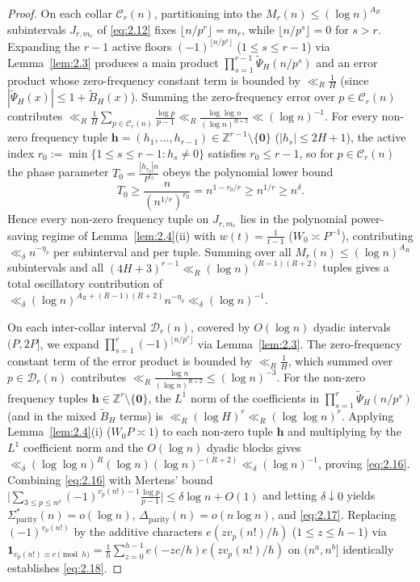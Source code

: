 \documentclass[11pt,reqno]{amsart}
\theoremstyle{remark}
\numberwithin{equation}{section}
\newcommand{\Z}{\mathbb{Z}}
\newcommand{\Dparity}{\Delta_{\mathrm{parity}}}
\newcommand{\Sparitys}{\Sigma_{\mathrm{parity}}^*}
\begin{document}
\begin{proof}
On each collar $\mathcal{C}_r(n)$, partitioning into the $M_r(n) \le (\log n)^{A_R}$ subintervals $J_{r,m_r}$ of \eqref{eq:2.12} fixes $\lfloor n/p^r \rfloor = m_r$, while $\lfloor n/p^s \rfloor = 0$ for $s > r$. Expanding the $r - 1$ active floors $(-1)^{\lfloor n/p^s \rfloor}$ ($1 \le s \le r - 1$) via Lemma~\ref{lem:2.3} produces a main product $\prod_{s=1}^{r-1} \widetilde{\Psi}_H(n/p^s)$ and an error product whose zero-frequency constant term is bounded by $\ll_R \frac{1}{H}$ (since $|\widetilde{\Psi}_H(x)| \le 1 + \widetilde{B}_H(x)$). Summing the zero-frequency error over $p \in \mathcal{C}_r(n)$ contributes $\ll_R \frac{1}{H} \sum_{p \in \mathcal{C}_r(n)} \frac{\log p}{p-1} \ll_R \frac{\log\log n}{(\log n)^{R+2}} \ll (\log n)^{-1}$. For every non-zero frequency tuple $\mathbf{h} = (h_1, \dots, h_{r-1}) \in \Z^{r-1} \setminus \{\mathbf{0}\}$ ($|h_s| \le 2H + 1$), the active index $r_0 := \min\{1 \le s \le r - 1 : h_s \ne 0\}$ satisfies $r_0 \le r - 1$, so for $p \in \mathcal{C}_r(n)$ the phase parameter $T_0 = \frac{|h_{r_0}|n}{P^{r_0}}$ obeys the polynomial lower bound
\[
T_0 \ge \frac{n}{(n^{1/r})^{r_0}} = n^{1 - r_0/r} \ge n^{1/r} \ge n^\delta.
\]
Hence every non-zero frequency tuple on $J_{r,m_r}$ lies in the polynomial power-saving regime of Lemma~\ref{lem:2.4}(ii) with $w(t) = \frac{1}{t-1}$ ($W_0 \asymp P^{-1}$), contributing $\ll_\delta n^{-\eta_\delta}$ per subinterval and per tuple. Summing over all $M_r(n) \le (\log n)^{A_R}$ subintervals and all $(4H + 3)^{r-1} \ll_R (\log n)^{(R-1)(R+2)}$ tuples gives a total oscillatory contribution of $\ll_\delta (\log n)^{A_R + (R-1)(R+2)} n^{-\eta_\delta} \ll_\delta (\log n)^{-1}$.

On each inter-collar interval $\mathcal{D}_r(n)$, covered by $O(\log n)$ dyadic intervals $(P, 2P]$, we expand $\prod_{s=1}^r (-1)^{\lfloor n/p^s \rfloor}$ via Lemma~\ref{lem:2.3}. The zero-frequency constant term of the error product is bounded by $\ll_R \frac{1}{H}$, which summed over $p \in \mathcal{D}_r(n)$ contributes $\ll_R \frac{\log n}{(\log n)^{R+2}} \le (\log n)^{-3}$. For the non-zero frequency tuples $\mathbf{h} \in \Z^r \setminus \{\mathbf{0}\}$, the $L^1$ norm of the coefficients in $\prod_{s=1}^r \widetilde{\Psi}_H(n/p^s)$ (and in the mixed $\widetilde{B}_H$ terms) is $\ll_R (\log H)^r \ll_R (\log\log n)^r$. Applying Lemma~\ref{lem:2.4}(i) ($W_0 P \asymp 1$) to each non-zero tuple $\mathbf{h}$ and multiplying by the $L^1$ coefficient norm and the $O(\log n)$ dyadic blocks gives $\ll_\delta (\log\log n)^R (\log n)(\log n)^{-(R+2)} \ll_\delta (\log n)^{-1}$, proving \eqref{eq:2.16}. Combining \eqref{eq:2.16} with Mertens' bound $\bigl|\sum_{3 \le p \le n^\delta} (-1)^{v_p(n!)-1} \frac{\log p}{p-1}\bigr| \le \delta\log n + O(1)$ and letting $\delta \downarrow 0$ yields $\Sparitys(n) = o(\log n)$, $\Dparity(n) = o(n\log n)$, and \eqref{eq:2.17}. Replacing $(-1)^{v_p(n!)}$ by the additive characters $e(z v_p(n!)/h)$ ($1 \le z \le h - 1$) via $\mathbf{1}_{v_p(n!) \equiv c \pmod h} = \frac{1}{h} \sum_{z=0}^{h-1} e(-zc/h)e(zv_p(n!)/h)$ on $(n^a, n^b]$ identically establishes \eqref{eq:2.18}.
\end{proof}
\end{document}
